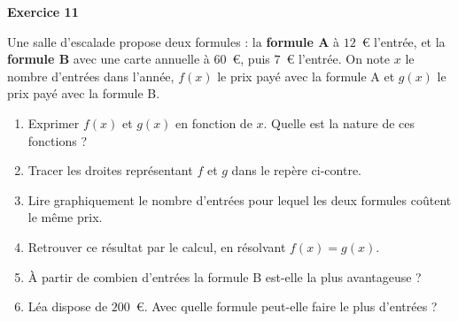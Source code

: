 \documentclass[a4paper,11pt]{article}
\newenvironment{exercice}[1]{%
  \Needspace{6\baselineskip}\par\bigskip\noindent\textbf{Exercice #1}\par\smallskip\noindent\ignorespaces
}{%
  \par
}
\begin{document}
\begin{exercice}{11}
Une salle d'escalade propose deux formules : la \textbf{formule A} à $12$~€ l'entrée, et la \textbf{formule B} avec une carte annuelle à $60$~€, puis $7$~€ l'entrée.
On note $x$ le nombre d'entrées dans l'année, $f(x)$ le prix payé avec la formule A et $g(x)$ le prix payé avec la formule B.

\medskip
\noindent
\begin{minipage}[c]{0.52\linewidth}
\begin{enumerate}[label=\arabic*.]
\item Exprimer $f(x)$ et $g(x)$ en fonction de $x$. Quelle est la nature de ces fonctions ?
\item Tracer les droites représentant $f$ et $g$ dans le repère ci-contre.
\item Lire graphiquement le nombre d'entrées pour lequel les deux formules coûtent le même prix.
\item Retrouver ce résultat par le calcul, en résolvant $f(x)=g(x)$.
\item À partir de combien d'entrées la formule B est-elle la plus avantageuse ?
\item Léa dispose de $200$~€. Avec quelle formule peut-elle faire le plus d'entrées ?
\end{enumerate}
\end{minipage}
\hfill
\begin{minipage}[c]{0.44\linewidth}
\centering
{}
\end{minipage}
\end{exercice}
\end{document}
